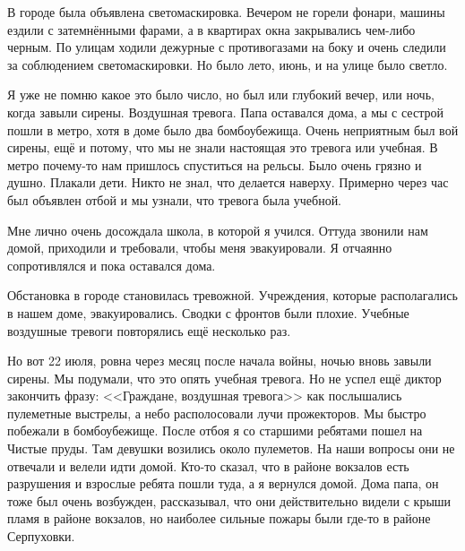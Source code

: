 В городе была объявлена светомаскировка. Вечером не горели фонари, машины ездили с затемнёнными фарами, а в квартирах окна закрывались чем-либо черным.
По улицам ходили дежурные с противогазами на боку и очень следили за соблюдением светомаскировки. Но было лето, июнь, и на улице было светло.

Я уже не помню какое это было число, но был или глубокий вечер, или ночь, когда завыли сирены. Воздушная тревога. Папа оставался дома, а мы с сестрой пошли в метро, хотя в доме было два бомбоубежища. Очень неприятным был вой сирены, ещё и потому, что мы не знали настоящая это тревога или учебная. В метро почему-то нам пришлось спуститься на рельсы. Было очень грязно и душно. Плакали дети. Никто не знал, что делается наверху. Примерно через час был объявлен отбой и мы узнали, что тревога была учебной.

Мне лично очень досождала школа, в которой я учился. Оттуда звонили нам домой, приходили и требовали, чтобы меня эвакуировали. Я отчаянно сопротивлялся и пока оставался дома.

Обстановка в городе становилась тревожной. Учреждения, которые располагались в нашем доме, эвакуировались. Сводки с фронтов были плохие. Учебные воздушные тревоги повторялись ещё несколько раз.

Но вот 22 июля, ровна через месяц после начала войны, ночью вновь завыли сирены. Мы подумали, что это опять учебная тревога. Но не успел ещё диктор закончить фразу: <<Граждане, воздушная тревога>> как послышались пулеметные выстрелы, а небо располосовали лучи прожекторов. Мы быстро побежали в бомбоубежище. После отбоя я со старшими ребятами пошел на Чистые пруды. Там девушки возились около пулеметов. На наши вопросы они не отвечали и велели идти домой. Кто-то сказал, что в районе вокзалов есть разрушения и взрослые ребята пошли туда, а я вернулся домой. Дома папа, он тоже был очень возбужден, рассказывал, что они действительно видели с крыши пламя в районе вокзалов, но наиболее сильные пожары были где-то в районе Серпуховки.

